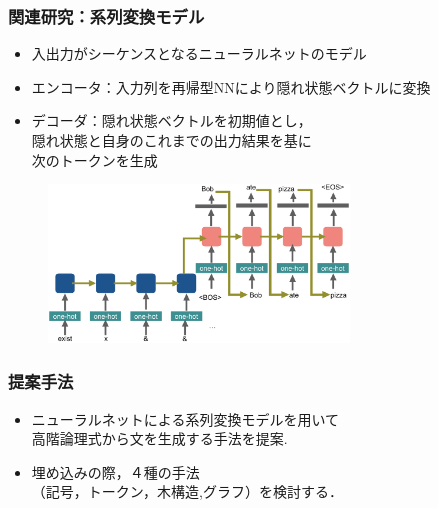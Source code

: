 \documentclass[dvipdfmx]{beamer}
\begin{document}
\begin{frame}
\frametitle{関連研究：系列変換モデル }
\begin{itemize}
  \item 入出力がシーケンスとなるニューラルネットのモデル
  \item エンコータ：入力列を再帰型NNにより隠れ状態ベクトルに変換
  \item デコーダ：隠れ状態ベクトルを初期値とし，\\隠れ状態と自身のこれまでの出力結果を基に\\次のトークンを生成
\end{itemize}

\begin{center}
\begin{figure}[h]
	\includegraphics[width=8cm]{learn_model.png}
        \label{fig:seq2seq}
\end{figure}
\end{center}

\end{frame}

\begin{frame}
\frametitle{提案手法}
\begin{center}
\end{center}
\begin{block}{}
  \begin{itemize}
    \item ニューラルネットによる系列変換モデルを用いて\\高階論理式から文を生成する手法を提案.
    \item 埋め込みの際，４種の手法\\{\color{berry}（記号，トークン，木構造,グラフ）}を検討する．
  \end{itemize}
\end{block}

\end{frame}
\end{document}
